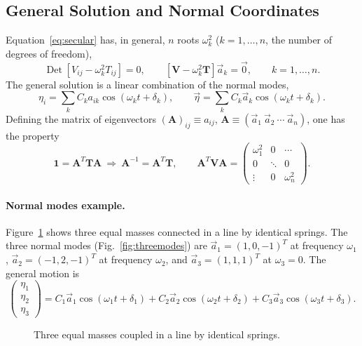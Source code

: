 \documentclass[11pt]{article}
\newcommand{\bT}{\mathbf{T}}
\newcommand{\bV}{\mathbf{V}}
\newcommand{\bA}{\mathbf{A}}
\newcommand{\bone}{\mathbf{1}}
\DeclareMathOperator{\Det}{Det}
\begin{document}
\subsection{General Solution and Normal Coordinates}

Equation~\eqref{eq:secular} has, in general, $n$ roots $\omega_k^2$ ($k=1,\dots,n$, the number of degrees of freedom),
\begin{equation}
\Det\left[V_{ij}-\omega_k^2 T_{ij}\right] = 0, \qquad \left[\bV-\omega_k^2\bT\right]\vec a_k = \vec 0, \qquad k=1,\dots,n.
\end{equation}
The general solution is a linear combination of the normal modes,
\begin{equation}
\eta_i = \sum_k C_k a_{ik}\cos(\omega_k t+\delta_k), \qquad \vec\eta = \sum_k C_k \vec a_k\cos(\omega_k t+\delta_k).
\end{equation}
Defining the matrix of eigenvectors $(\bA)_{ij}\equiv a_{ij}$, $\bA \equiv (\vec a_1\ \vec a_2\ \cdots\ \vec a_n)$, one has the property
\begin{equation}
\bone = \bA^{T}\bT\bA \ \Longrightarrow\ \bA^{-1}=\bA^{T}\bT, \qquad \bA^{T}\bV\bA = \begin{pmatrix}\omega_1^2 & 0 & \cdots\\ 0 & \ddots & 0\\ \vdots & 0 & \omega_n^2\end{pmatrix}.
\end{equation}

\paragraph{Normal modes example.} Figure~\ref{fig:threemass} shows three equal masses connected in a line by identical springs. The three normal modes (Fig.~\ref{fig:threemodes}) are $\vec a_1 = (1,0,-1)^T$ at frequency $\omega_1$, $\vec a_2 = (-1,2,-1)^T$ at frequency $\omega_2$, and $\vec a_3=(1,1,1)^T$ at $\omega_3=0$. The general motion is
\begin{equation}
\begin{pmatrix}\eta_1\\\eta_2\\\eta_3\end{pmatrix} = C_1\vec a_1\cos(\omega_1 t+\delta_1)+C_2\vec a_2\cos(\omega_2 t+\delta_2)+C_3\vec a_3\cos(\omega_3 t+\delta_3).
\end{equation}

\begin{figure}[htb]
\centering
{}
\caption{Three equal masses coupled in a line by identical springs.}
\label{fig:threemass}
\end{figure}
\end{document}
